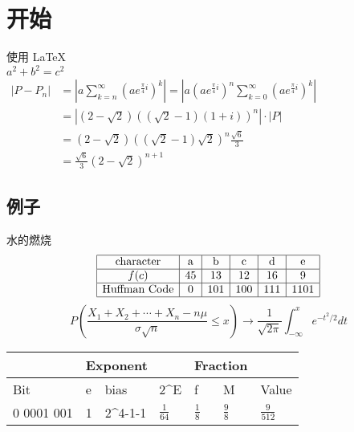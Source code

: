 \documentclass[UTF8]{article}
\begin{document}
       
 
\section{开始}   
使用       
\LaTeX \,\\ 
 $a^2+b^2=c^2$\\
 $\begin{aligned}
    \left|P-P_{n}\right|&=\left|a \sum_{k=n}^{\infty}\left(a e^{\frac{\pi}{4} i}\right)^{k}\right|=\left|a\left(a e^{\frac{\pi}{4} i}\right)^{n} \sum_{k=0}^{\infty}\left(a e^{\frac{\pi}{4} i}\right)^{k}\right|\\&=\left|(2-\sqrt{2})((\sqrt{2}-1)(1+i))^{n}\right| \cdot|P|\\&=(2-\sqrt{2})((\sqrt{2}-1) \sqrt{2})^{n} \frac{\sqrt{6}}{3}\\&=\frac{\sqrt{6}}{3}(2-\sqrt{2})^{n+1}\end{aligned}$

\subsection{例子}  

水的燃烧\\
$$\begin{array}{|c|c|c|c|c|c|}
    \hline
    \text{character}&\text{a}&\text{b}&\text{c}&\text{d}&\text{e}\\
    \hline
    f(c)&45&13&12&16&9\\
    \hline
    \text{Huffman Code}&0&101&100&111&1101\\
    \hline
    \end{array}$$
$$P\left(\frac{X_{1}+X_{2}+\cdots+X_{n}-n \mu}{\sigma \sqrt{n}} \leq x\right)\to \frac{1}{\sqrt{2 \pi}} \int_{-\infty}^{x} e^{-t^{2} / 2} d t$$


\begin{table}[htbp]
    \begin{tabular}{|l|l|l|l|l|l|l|}
    \hline
               & \multicolumn{3}{l|}{Exponent}                                      & \multicolumn{2}{l|}{Fraction}                   &                                  \\ \hline
    Bit        & e & bias                         & 2^E            & f                      & M                      & Value                            \\ \hline
    0 0001 001 & 1 & 2^{4-1}-1 & $\frac{1}{64} $& $\frac18$ & $\frac98$ & $\frac{9}{512}$ \\ \hline
    \end{tabular}
    \end{table}
\end{document}
